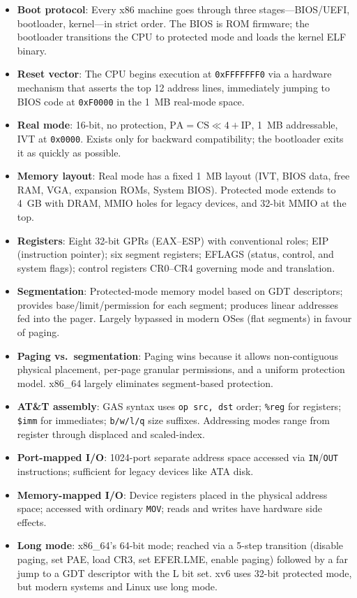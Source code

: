 \documentclass[11pt]{article}
\begin{document}
\begin{itemize}
    \item \textbf{Boot protocol}: Every x86 machine goes through three stages---BIOS/UEFI,
          bootloader, kernel---in strict order. The BIOS is ROM firmware; the bootloader
          transitions the CPU to protected mode and loads the kernel ELF binary.
    \item \textbf{Reset vector}: The CPU begins execution at \texttt{0xFFFFFFF0} via a
          hardware mechanism that asserts the top 12 address lines, immediately jumping to
          BIOS code at \texttt{0xF0000} in the 1~MB real-mode space.
    \item \textbf{Real mode}: 16-bit, no protection, $\text{PA} = \text{CS} \ll 4 + \text{IP}$,
          1~MB addressable, IVT at \texttt{0x0000}. Exists only for backward compatibility;
          the bootloader exits it as quickly as possible.
    \item \textbf{Memory layout}: Real mode has a fixed 1~MB layout (IVT, BIOS data, free
          RAM, VGA, expansion ROMs, System BIOS). Protected mode extends to 4~GB with DRAM,
          MMIO holes for legacy devices, and 32-bit MMIO at the top.
    \item \textbf{Registers}: Eight 32-bit GPRs (EAX--ESP) with conventional roles; EIP
          (instruction pointer); six segment registers; EFLAGS (status, control, and system
          flags); control registers CR0--CR4 governing mode and translation.
    \item \textbf{Segmentation}: Protected-mode memory model based on GDT descriptors;
          provides base/limit/permission for each segment; produces linear addresses fed into
          the pager. Largely bypassed in modern OSes (flat segments) in favour of paging.
    \item \textbf{Paging vs.\ segmentation}: Paging wins because it allows non-contiguous
          physical placement, per-page granular permissions, and a uniform protection model.
          x86\_64 largely eliminates segment-based protection.
    \item \textbf{AT\&T assembly}: GAS syntax uses \texttt{op src, dst} order; \texttt{\%reg}
          for registers; \texttt{\$imm} for immediates; \texttt{b/w/l/q} size suffixes.
          Addressing modes range from register through displaced and scaled-index.
    \item \textbf{Port-mapped I/O}: 1024-port separate address space accessed via
          \texttt{IN}/\texttt{OUT} instructions; sufficient for legacy devices like ATA disk.
    \item \textbf{Memory-mapped I/O}: Device registers placed in the physical address space;
          accessed with ordinary \texttt{MOV}; reads and writes have hardware side effects.
    \item \textbf{Long mode}: x86\_64's 64-bit mode; reached via a 5-step transition
          (disable paging, set PAE, load CR3, set EFER.LME, enable paging) followed by a
          far jump to a GDT descriptor with the L bit set. xv6 uses 32-bit protected mode,
          but modern systems and Linux use long mode.
\end{itemize}
\end{document}
